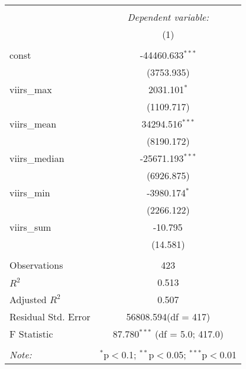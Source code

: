 \begin{table}[!htbp] \centering
\begin{tabular}{@{\extracolsep{5pt}}lc}
\\[-1.8ex]\hline
\hline \\[-1.8ex]
& \multicolumn{1}{c}{\textit{Dependent variable:}} \
\cr \cline{1-2}
\\[-1.8ex] & (1) \\
\hline \\[-1.8ex]
 const & -44460.633$^{***}$ \\
  & (3753.935) \\
 viirs_max & 2031.101$^{*}$ \\
  & (1109.717) \\
 viirs_mean & 34294.516$^{***}$ \\
  & (8190.172) \\
 viirs_median & -25671.193$^{***}$ \\
  & (6926.875) \\
 viirs_min & -3980.174$^{*}$ \\
  & (2266.122) \\
 viirs_sum & -10.795$^{}$ \\
  & (14.581) \\
\hline \\[-1.8ex]
 Observations & 423 \\
 $R^2$ & 0.513 \\
 Adjusted $R^2$ & 0.507 \\
 Residual Std. Error & 56808.594(df = 417)  \\
 F Statistic & 87.780$^{***}$ (df = 5.0; 417.0) \\
\hline
\hline \\[-1.8ex]
\textit{Note:} & \multicolumn{1}{r}{$^{*}$p$<$0.1; $^{**}$p$<$0.05; $^{***}$p$<$0.01} \\
\end{tabular}
\end{table}